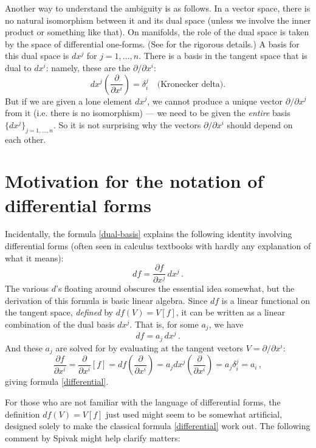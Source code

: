 \documentclass[12pt]{article}
\begin{document}
Another way to understand the ambiguity is as follows.
In a vector space, there is no natural isomorphism between
it and its dual space (unless we involve the inner product or something like that).  On manifolds, the role of the dual space
is taken by the space of differential one-forms.
(See 
for the rigorous details.) A basis for this dual space
is $dx^j$ for $j = 1, \dotsc, n$.
There is a basis in the tangent space that is dual to $dx^i$:
namely, these are the $\partial/\partial x^i$:
\begin{equation}\label{dual-basis}
dx^j \left( \frac{\partial}{\partial x^i} \right) = \delta_i^j \quad \text{(Kronecker delta).}
\end{equation}
But if we are given a lone element $dx^j$, we
cannot produce
a unique vector $\partial /\partial x^j$ from it (i.e. there is no isomorphism) ---
we need to be given the \emph{entire} basis $\{ dx^j \}_{j=1, \dotsc, n}$.
So it is not surprising why the vectors $\partial / \partial x^i$ should depend
on each other.

\section*{Motivation for the notation of differential forms}

Incidentally, the formula \eqref{dual-basis} explains the following 
identity involving differential forms (often seen in calculus textbooks with hardly
any explanation of what it means):
\begin{equation}\label{differential}
df = \frac{\partial f}{\partial x^j} \, dx^j\,.
\end{equation}
The various $d$'s floating around obscures the essential idea somewhat,
but the derivation of this formula is basic linear algebra.  Since $df$
is a linear functional on the tangent space,
\emph{defined} by $df(V) = V[f]$, it can be written
as a linear combination of the dual basis $dx^j$.
That is, for some $a_j$, we have
\[
df = a_j \, dx^j\,.
\]
And these $a_j$ are solved for by evaluating at the tangent
vectors $V = \partial/\partial x^i$:
\[
\frac{\partial f}{\partial x^i} = \frac{\partial}{\partial x^i} [f] = df\left( \frac{\partial}{\partial x^i} \right) =
a_j dx^j\left( \frac{\partial}{\partial x^i} \right) = a_j \delta_i^j = a_i\,,
\]
giving formula \eqref{differential}.

For those who are not familiar with the language of differential forms,
the definition $df(V) = V[f]$ just used
might seem to be somewhat artificial, designed solely to make
the classical formula \eqref{differential} work out.
The following comment by Spivak\cite{Spivak1} might help clarify matters:
\end{document}
